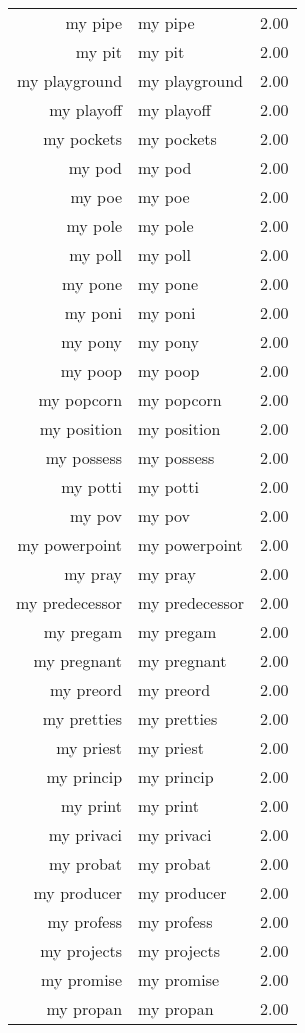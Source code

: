 \begin{table}[ht]
\begin{tabular}{rlr}
  my pipe & my pipe & 2.00 \\ 
  my pit & my pit & 2.00 \\ 
  my playground & my playground & 2.00 \\ 
  my playoff & my playoff & 2.00 \\ 
  my pockets & my pockets & 2.00 \\ 
  my pod & my pod & 2.00 \\ 
  my poe & my poe & 2.00 \\ 
  my pole & my pole & 2.00 \\ 
  my poll & my poll & 2.00 \\ 
  my pone & my pone & 2.00 \\ 
  my poni & my poni & 2.00 \\ 
  my pony & my pony & 2.00 \\ 
  my poop & my poop & 2.00 \\ 
  my popcorn & my popcorn & 2.00 \\ 
  my position & my position & 2.00 \\ 
  my possess & my possess & 2.00 \\ 
  my potti & my potti & 2.00 \\ 
  my pov & my pov & 2.00 \\ 
  my powerpoint & my powerpoint & 2.00 \\ 
  my pray & my pray & 2.00 \\ 
  my predecessor & my predecessor & 2.00 \\ 
  my pregam & my pregam & 2.00 \\ 
  my pregnant & my pregnant & 2.00 \\ 
  my preord & my preord & 2.00 \\ 
  my pretties & my pretties & 2.00 \\ 
  my priest & my priest & 2.00 \\ 
  my princip & my princip & 2.00 \\ 
  my print & my print & 2.00 \\ 
  my privaci & my privaci & 2.00 \\ 
  my probat & my probat & 2.00 \\ 
  my producer & my producer & 2.00 \\ 
  my profess & my profess & 2.00 \\ 
  my projects & my projects & 2.00 \\ 
  my promise & my promise & 2.00 \\ 
  my propan & my propan & 2.00 \\ 

\end{tabular}
\end{table}
